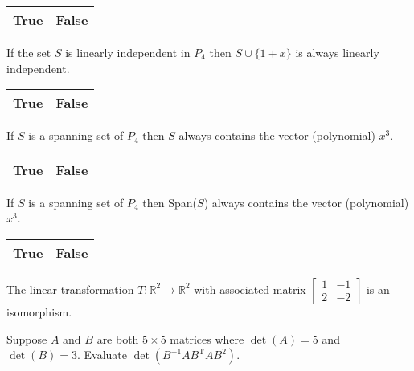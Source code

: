 \documentclass[10pt]{exam}
\begin{document}
\begin{questions}
\begin{choices}
\choice \begin{tabular}{|c|c|}\hline True & False \\ \hline \end{tabular} If the set $S$ is linearly independent in $P_4$ then $S \cup \{1+x\}$ is always linearly independent.
\choice \begin{tabular}{|c|c|}\hline True & False \\ \hline \end{tabular} If $S$ is a spanning set of $P_4$ then $S$ always contains the vector (polynomial) $x^3$.  
\choice \begin{tabular}{|c|c|}\hline True & False \\ \hline \end{tabular} If $S$ is a spanning set of $P_4$ then Span($S$) always contains the vector (polynomial) $x^3$.
\choice \begin{tabular}{|c|c|}\hline True & False \\ \hline \end{tabular} The linear transformation $T{:}\mathbb{R}^2 \rightarrow \mathbb{R}^2$ with associated matrix $\left[\begin{array}{rr} 1 & -1 \\ 2 & -2 \end{array} \right]$ is an isomorphism. 
\end{choices}

\question
Suppose $A$ and $B$ are both $5\times 5$ matrices where $\det(A)=5$ and $\det(B)=3$. Evaluate $\det(B^{-1}AB^{\text{T}}AB^2)$.

\question
{}


\end{questions}
\end{document}
